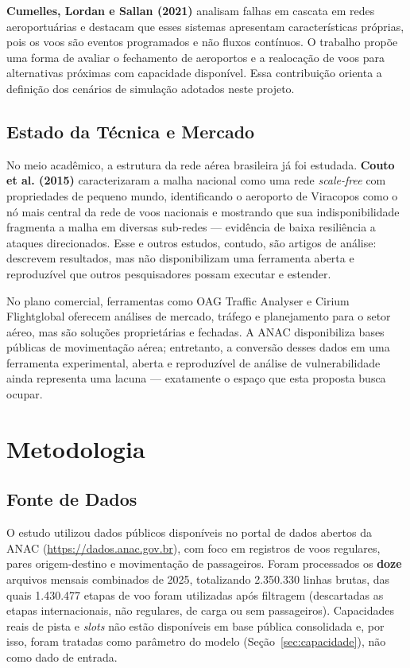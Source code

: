 \documentclass[12pt,a4paper]{article}
\begin{document}
\textbf{Cumelles, Lordan e Sallan (2021)} analisam falhas em cascata em redes aeroportuárias e
destacam que esses sistemas apresentam características próprias, pois os voos são eventos
programados e não fluxos contínuos. O trabalho propõe uma forma de avaliar o fechamento de
aeroportos e a realocação de voos para alternativas próximas com capacidade disponível. Essa
contribuição orienta a definição dos cenários de simulação adotados neste projeto.

\subsection{Estado da Técnica e Mercado}

No meio acadêmico, a estrutura da rede aérea brasileira já foi estudada. \textbf{Couto et al.
(2015)} caracterizaram a malha nacional como uma rede \textit{scale-free} com propriedades de
pequeno mundo, identificando o aeroporto de Viracopos como o nó mais central da rede de voos
nacionais e mostrando que sua indisponibilidade fragmenta a malha em diversas sub-redes — evidência
de baixa resiliência a ataques direcionados. Esse e outros estudos, contudo, são artigos de
análise: descrevem resultados, mas não disponibilizam uma ferramenta aberta e reproduzível que
outros pesquisadores possam executar e estender.

No plano comercial, ferramentas como OAG Traffic Analyser e Cirium Flightglobal oferecem análises de
mercado, tráfego e planejamento para o setor aéreo, mas são soluções proprietárias e fechadas. A
ANAC disponibiliza bases públicas de movimentação aérea; entretanto, a conversão desses dados em
uma ferramenta experimental, aberta e reproduzível de análise de vulnerabilidade ainda representa
uma lacuna — exatamente o espaço que esta proposta busca ocupar.

\section{Metodologia}

\subsection{Fonte de Dados}

O estudo utilizou dados públicos disponíveis no portal de dados abertos da ANAC
(\url{https://dados.anac.gov.br}), com foco em registros de voos regulares, pares
origem-destino e movimentação de passageiros. Foram processados os \textbf{doze} arquivos mensais
combinados de 2025, totalizando 2.350.330 linhas brutas, das quais 1.430.477 etapas de voo foram
utilizadas após filtragem (descartadas as etapas internacionais, não regulares, de carga ou sem
passageiros). Capacidades
reais de pista e \textit{slots} não estão disponíveis em base pública consolidada e, por isso,
foram tratadas como parâmetro do modelo (Seção~\ref{sec:capacidade}), não como dado de entrada.
\end{document}
